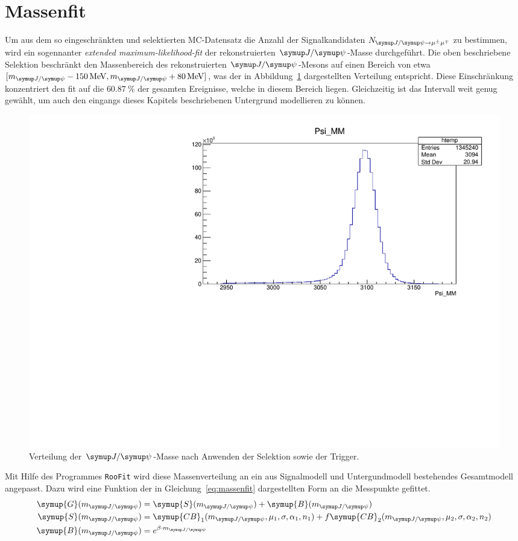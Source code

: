 \section{Massenfit}
%
Um aus dem so eingeschränkten und selektierten MC-Datensatz die Anzahl der Signalkandidaten $N_{\kontroll}$ zu bestimmen, wird ein sogennanter \textit{extended maximum-likelihood-fit} der rekonstruierten $\jpsi$-Masse durchgeführt. Die oben beschriebene Selektion beschränkt den Massenbereich des rekonstruierten $\jpsi$-Mesons auf einen Bereich von etwa $[m_{\jpsi}-\SI{150}{\mega\electronvolt}, m_{\jpsi}+\SI{80}{\mega\electronvolt}]$, was der in Abbildung~\ref{fig:mass} dargestellten Verteilung entspricht. Diese Einschränkung konzentriert den fit auf die $\SI{60.87}{\percent}$ der gesamten Ereignisse, welche in diesem Bereich liegen. Gleichzeitig ist das Intervall weit genug gewählt, um auch den eingangs dieses Kapitels beschriebenen Untergrund modellieren zu können.
%
\begin{figure}[H]
  \centering
      \includegraphics[width=\textwidth]{Plots/jpsi_mass.pdf}
  \caption{Verteilung der $\jpsi$-Masse nach Anwenden der Selektion sowie der Trigger.}
  \label{fig:mass}
\end{figure}
%
Mit Hilfe des Programmes \texttt{RooFit} wird diese Massenverteilung an ein aus Signalmodell und Untergundmodell bestehendes Gesamtmodell angepasst. Dazu wird eine Funktion der in Gleichung~\ref{eq:massenfit} dargestellten Form an die Messpunkte gefittet.
%
\begin{align}
  \symup{G}(m_{\jpsi})=&\; \symup{S}(m_{\jpsi}) + \symup{B}(m_{\jpsi})\\
  \label{eq:massenfit}
  \symup{S}(m_{\jpsi})=&\; \symup{CB}_1(m_{\jpsi},\mu_1,\sigma,\alpha_1,n_1)+f\symup{CB}_2(m_{\jpsi},\mu_2,\sigma,\alpha_2,n_2) \\
  \symup{B}(m_{\jpsi})=&\; e^{\beta\cdot m_{\jpsi}}
\end{align}
